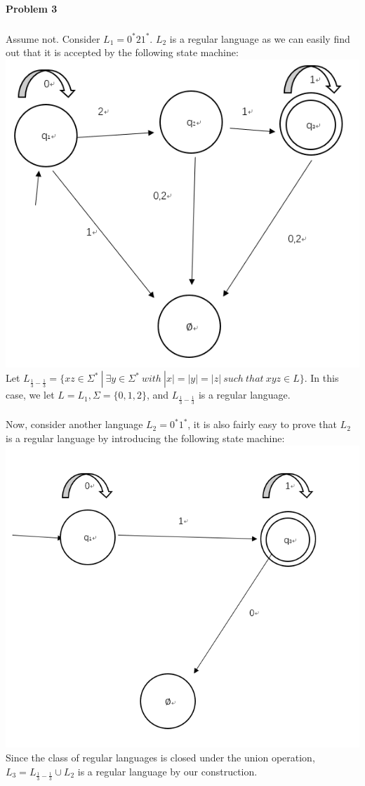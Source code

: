 \documentclass[letterpaper, 12pt]{article}
\theoremstyle{definition}
\numberwithin{equation}{section}
\begin{document}
\paragraph{Problem 3}
\subparagraph {}
Assume not. Consider $L_1=0^*21^*$. $L_2$ is a regular language as we can easily find out that it is accepted by the following state machine:
\includegraphics{statemachine_1} \\
Let $L_{\frac{1}{3}-\frac{1}{3}} = \{xz \in \Sigma^*\ |\ \exists y \in \Sigma^*\  with\  |x|=|y|=|z|\ such\ that\ xyz \in L\}$. In this case, we let $L = L_1, \Sigma = \{0,1,2\}$, and $L_{\frac{1}{3}-\frac{1}{3}}$ is a regular language. \\~\\
Now, consider another language $L_2 = 0^*1^*$, it is also fairly easy to prove that $L_2$ is a regular language by introducing the following state machine:
\includegraphics{statemachine_2} \\
Since the class of regular languages is closed under the union operation,  $L_3 = L_{\frac{1}{3}-\frac{1}{3}} \cup L_2$ is a regular language by our construction. \\~\\
\end{document}

